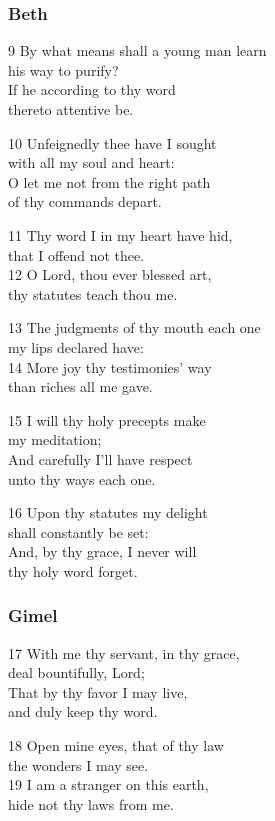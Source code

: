 \subsubsection*{Beth}

9 By what means shall a young man learn\\
his way to purify?\\
If he according to thy word\\
thereto attentive be.

10 Unfeignedly thee have I sought\\
with all my soul and heart:\\
O let me not from the right path\\
of thy commands depart.

11 Thy word I in my heart have hid,\\
that I offend not thee.\\
12 O Lord, thou ever blessed art,\\
thy statutes teach thou me.

13 The judgments of thy mouth each one\\
my lips declared have:\\
14 More joy thy testimonies' way\\
than riches all me gave.

15 I will thy holy precepts make\\
my meditation;\\
And carefully I’ll have respect\\
unto thy ways each one.

16 Upon thy statutes my delight\\
shall constantly be set:\\
And, by thy grace, I never will\\
thy holy word forget.

\subsubsection*{Gimel}

17 With me thy servant, in thy grace,\\
deal bountifully, Lord;\\
That by thy favor I may live,\\
and duly keep thy word.

18 Open mine eyes, that of thy law\\
the wonders I may see.\\
19 I am a stranger on this earth,\\
hide not thy laws from me.

